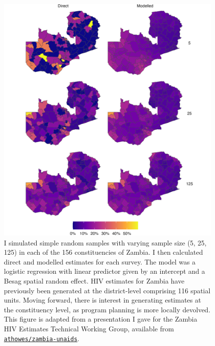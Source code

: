 \documentclass[a4paper, nobind]{templates/ociamthesis}
\begin{document}
\begin{figure}

{\centering \includegraphics[width=0.95\linewidth]{figures/bayesian/zmb-maps} 

}

\caption{I simulated simple random samples with varying sample size (5, 25, 125) in each of the 156 constituencies of Zambia. I then calculated direct and modelled estimates for each survey. The model was a logistic regression with linear predictor given by an intercept and a Besag spatial random effect. HIV estimates for Zambia have previously been generated at the district-level comprising 116 spatial units. Moving forward, there is interest in generating estimates at the constituency level, as program planning is more locally devolved. This figure is adapted from a presentation I gave for the Zambia HIV Estimates Technical Working Group, available from \href{https://github.com/athowes/zambia-unaids}{\texttt{athowes/zambia-unaids}}.}\label{fig:zmb-maps}
\end{figure}
\end{document}

